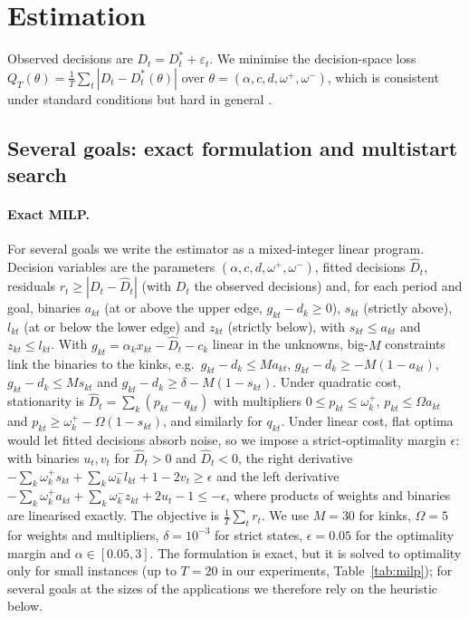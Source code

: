 \documentclass[pdflatex,sn-basic]{sn-jnl}
\theoremstyle{thmstyleone}\newtheorem{proposition}{Proposition}\newtheorem{theorem}{Theorem}
\theoremstyle{thmstylethree}\newtheorem{remark}{Remark}
\begin{document}
\section{Estimation}\label{sec:alg}
Observed decisions are $D_t=D_t^*+\varepsilon_t$. We minimise the decision-space loss $Q_T(\theta)=\frac1T\sum_t|D_t-D^*_t(\theta)|$ over $\theta=(\alpha,c,d,\omega^+,\omega^-)$, which is consistent under standard conditions but hard in general \citep{aswani2018}.

\subsection{Several goals: exact formulation and multistart search}\label{sec:multi}
\paragraph{Exact MILP.} For several goals we write the estimator as a mixed-integer linear program. Decision variables are the parameters $(\alpha,c,d,\omega^+,\omega^-)$, fitted decisions $\hat D_t$, residuals $r_t\ge|D_t-\hat D_t|$ (with $D_t$ the observed decisions) and, for each period and goal, binaries $a_{kt}$ (at or above the upper edge, $g_{kt}-d_k\ge0$), $s_{kt}$ (strictly above), $l_{kt}$ (at or below the lower edge) and $z_{kt}$ (strictly below), with $s_{kt}\le a_{kt}$ and $z_{kt}\le l_{kt}$. With $g_{kt}=\alpha_kx_{kt}-\hat D_t-c_k$ linear in the unknowns, big-$M$ constraints link the binaries to the kinks, e.g.\ $g_{kt}-d_k\le Ma_{kt}$, $g_{kt}-d_k\ge-M(1-a_{kt})$, $g_{kt}-d_k\le Ms_{kt}$ and $g_{kt}-d_k\ge\delta-M(1-s_{kt})$. Under quadratic cost, stationarity is $\hat D_t=\sum_k(p_{kt}-q_{kt})$ with multipliers $0\le p_{kt}\le\omega_k^+$, $p_{kt}\le\Omega a_{kt}$ and $p_{kt}\ge\omega_k^+-\Omega(1-s_{kt})$, and similarly for $q_{kt}$. Under linear cost, flat optima would let fitted decisions absorb noise, so we impose a strict-optimality margin $\epsilon$: with binaries $u_t,v_t$ for $\hat D_t>0$ and $\hat D_t<0$, the right derivative $-\sum_k\omega_k^+s_{kt}+\sum_k\omega_k^-l_{kt}+1-2v_t\ge\epsilon$ and the left derivative $-\sum_k\omega_k^+a_{kt}+\sum_k\omega_k^-z_{kt}+2u_t-1\le-\epsilon$, where products of weights and binaries are linearised exactly. The objective is $\frac1T\sum_tr_t$. We use $M=30$ for kinks, $\Omega=5$ for weights and multipliers, $\delta=10^{-3}$ for strict states, $\epsilon=0.05$ for the optimality margin and $\alpha\in[0.05,3]$. The formulation is exact, but it is solved to optimality only for small instances (up to $T=20$ in our experiments, Table~\ref{tab:milp}); for several goals at the sizes of the applications we therefore rely on the heuristic below.
\end{document}

